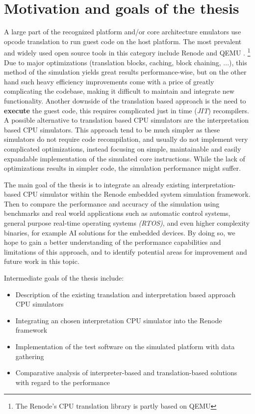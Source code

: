 \section{Motivation and goals of the thesis}

A large part of the recognized platform and/or core architecture emulators use opcode translation to run guest code
on the host platform. The most prevalent and widely used open source tools in this category include Renode \cite{Renode}
and QEMU \cite{Qemu}.%
\footnote{The Renode's CPU translation library is partly based on QEMU}
Due to major optimizations (translation blocks, caching, block chaining, ...), this method of the simulation yields
great results performance-wise, but on the other hand such heavy efficiency improvements come with a price of greatly 
complicating the codebase, making it difficult to maintain and integrate new functionality. Another downside of the
translation based approach is the need to \textbf{execute} the guest code, this requires complicated just in
time (\textit{JIT}) recompilers. A possible alternative to translation based CPU simulators are the interpretation
based CPU simulators. This approach tend to be much simpler as these simulators do not require code recompilation,
and usually do not implement very complicated optimizations, instead focusing on simple, maintainable and easily
expandable implementation of the simulated core instructions. While the lack of optimizations results in simpler
code, the simulation performance might suffer.

The main goal of the thesis is to integrate an already existing interpretation-based CPU simulator within the Renode
embedded system simulation framework. Then to compare the performance and accuracy of the simulation using benchmarks
and real world applications such as automatic control systems, general purpose real-time operating systems 
\textit{(RTOS)}, and even higher complexity binaries, for example AI solutions for the embedded devices.
By doing so, we hope to gain a better understanding of the performance capabilities and limitations of this approach,
and to identify potential areas for improvement and future work in this topic.

\noindent Intermediate goals of the thesis include:
\begin{itemize}
	\item{Description of the existing translation and interpretation based approach CPU simulators}
	\item{Integrating an chosen interpretation CPU simulator into the Renode framework}
	\item{Implementation of the test software on the simulated platform with data gathering}
	\item{Comparative analysis of interpreter-based and translation-based solutions with regard to the performance}
\end{itemize}

